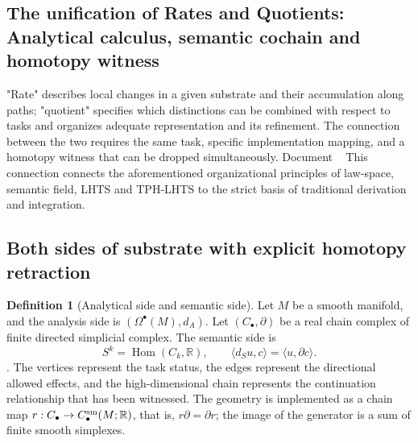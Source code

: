 \documentclass[11pt,a4paper]{article}
\theoremstyle{plain}
\theoremstyle{definition}
\newtheorem{definition}[theorem]{Definition}
\theoremstyle{remark}
\begin{document}
\begin{CJK*}
\section { The unification of Rates and Quotients: Analytical calculus, semantic cochain and homotopy witness }\label{pc:calculus}


"Rate" describes local changes in a given substrate and their accumulation along paths; "quotient" specifies which distinctions can be combined with respect to tasks and organizes adequate representation and its refinement. The connection between the two requires the same task, specific implementation mapping, and a homotopy witness that can be dropped simultaneously. Document ~ \cite{S38} This connection connects the aforementioned organizational principles of law-space, semantic field, LHTS and TPH-LHTS to the strict basis of traditional derivation and integration.

\subsection { Both sides of substrate with explicit homotopy retraction }

\begin{definition}
[Analytical side and semantic side]Let $M$ be a smooth manifold, and the analysis side is $(\Omega^\bullet(M),d_A)$. Let $(C_\bullet,\partial)$ be a real chain complex of finite directed simplicial complex. The semantic side is \[
 S^k=\operatorname{Hom}(C_k,\mathbb R),\qquad
 \langle d_Su,c\rangle=\langle u,\partial c\rangle.
\]. The vertices represent the task status, the edges represent the directional allowed effects, and the high-dimensional chain represents the continuation relationship that has been witnessed. The geometry is implemented as a chain map $r:C_\bullet\to C_\bullet^{\rm sm}(M;\mathbb R)$, that is, $r\partial=\partial r$; the image of the generator is a sum of finite smooth simplexes.\end{definition}



\end{CJK*}
\end{document}
